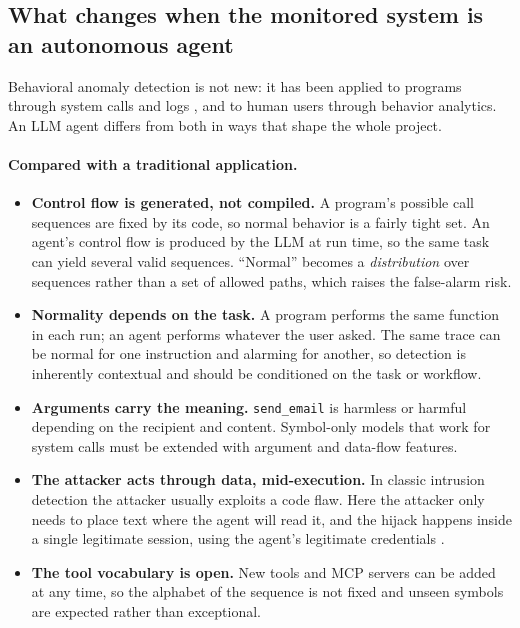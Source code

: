 \documentclass[11pt,a4paper]{article}
\begin{document}
\subsection{What changes when the monitored system is an autonomous agent}

Behavioral anomaly detection is not new: it has been applied to programs through system calls \citep{forrest1996sense} and logs \citep{du2017deeplog}, and to human users through behavior analytics. An LLM agent differs from both in ways that shape the whole project.

\paragraph{Compared with a traditional application.}
\begin{itemize}
  \item \textbf{Control flow is generated, not compiled.} A program's possible call sequences are fixed by its code, so normal behavior is a fairly tight set. An agent's control flow is produced by the LLM at run time, so the same task can yield several valid sequences. ``Normal'' becomes a \emph{distribution} over sequences rather than a set of allowed paths, which raises the false-alarm risk.
  \item \textbf{Normality depends on the task.} A program performs the same function in each run; an agent performs whatever the user asked. The same trace can be normal for one instruction and alarming for another, so detection is inherently contextual and should be conditioned on the task or workflow.
  \item \textbf{Arguments carry the meaning.} \texttt{send\_email} is harmless or harmful depending on the recipient and content. Symbol-only models that work for system calls must be extended with argument and data-flow features.
  \item \textbf{The attacker acts through data, mid-execution.} In classic intrusion detection the attacker usually exploits a code flaw. Here the attacker only needs to place text where the agent will read it, and the hijack happens inside a single legitimate session, using the agent's legitimate credentials \citep{greshake2023indirect,invariant2025github}.
  \item \textbf{The tool vocabulary is open.} New tools and MCP servers can be added at any time, so the alphabet of the sequence is not fixed and unseen symbols are expected rather than exceptional.
\end{itemize}
\end{document}
